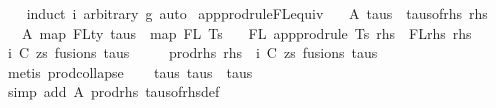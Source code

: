 \begin{isabellebody}
%
\isadelimproof
\ \ %
\endisadelimproof
%
\isatagproof
{}\isamarkupfalse%
\ {\isacharparenleft}{\kern0pt}induct\ i\ arbitrary{\isacharcolon}{\kern0pt}\ g{\isacharparenright}{\kern0pt}\ auto%
\endisatagproof
{\isafoldproof}%
%
\isadelimproof
\isanewline
%
\endisadelimproof
\isanewline
\isanewline
{}\isamarkupfalse%
\ app{\isacharunderscore}{\kern0pt}prodrule{\isacharunderscore}{\kern0pt}FL{\isacharunderscore}{\kern0pt}equiv{\isacharcolon}{\kern0pt}\isanewline
\ \ \ A{}{\isacharcolon}{\kern0pt}\ {\isachardoublequoteopen}taus\ {\isacharequal}{\kern0pt}\ taus{\isacharunderscore}{\kern0pt}of{\isacharunderscore}{\kern0pt}rhs\ rhs{\isachardoublequoteclose}\isanewline
\ \ \ A{}{\isacharcolon}{\kern0pt}\ {\isachardoublequoteopen}map\ FLty\ taus\ {\isacharequal}{\kern0pt}\ map\ FL\ Ts{\isachardoublequoteclose}\isanewline
\ \ \ {\isachardoublequoteopen}FL\ {\isacharparenleft}{\kern0pt}app{\isacharunderscore}{\kern0pt}prodrule\ Ts\ rhs{\isacharparenright}{\kern0pt}\ {\isacharequal}{\kern0pt}\ FLrhs\ rhs{\isachardoublequoteclose}\isanewline
%
\isadelimproof
%
\endisadelimproof
%
\isatagproof
{}\isamarkupfalse%
\ {\isacharminus}{\kern0pt}\isanewline
\ \ \isamarkupfalse%
\ i\ C\ zs\ fusions\ taus{\isacharprime}{\kern0pt}\ \isanewline
\ \ \ \ prod{\isacharunderscore}{\kern0pt}rhs{\isacharcolon}{\kern0pt}\ {\isachardoublequoteopen}rhs\ {\isacharequal}{\kern0pt}\ {\isacharparenleft}{\kern0pt}i{\isacharcomma}{\kern0pt}\ {\isacharparenleft}{\kern0pt}C{\isacharcomma}{\kern0pt}\ zs{\isacharparenright}{\kern0pt}{\isacharcomma}{\kern0pt}\ fusions{\isacharcomma}{\kern0pt}\ taus{\isacharprime}{\kern0pt}{\isacharparenright}{\kern0pt}{\isachardoublequoteclose}\isanewline
\ \ \ \isamarkupfalse%
\ {\isacharparenleft}{\kern0pt}metis\ prod{\isachardot}{\kern0pt}collapse{\isacharparenright}{\kern0pt}\isanewline
\isanewline
\ \ \isamarkupfalse%
\ taus{\isacharcolon}{\kern0pt}\ {\isachardoublequoteopen}taus{\isacharprime}{\kern0pt}\ {\isacharequal}{\kern0pt}\ taus{\isachardoublequoteclose}\isanewline
\ \ \ \ \isamarkupfalse%
\ {\isacharparenleft}{\kern0pt}simp\ add{\isacharcolon}{\kern0pt}\ A{}\ prod{\isacharunderscore}{\kern0pt}rhs\ taus{\isacharunderscore}{\kern0pt}of{\isacharunderscore}{\kern0pt}rhs{\isacharunderscore}{\kern0pt}def{\isacharparenright}{\kern0pt}\isanewline
\ \ \isamarkupfalse%
\ \isamarkupfalse%

\end{isabellebody}
